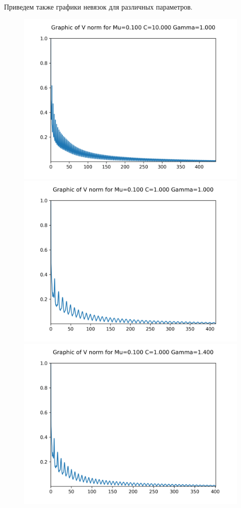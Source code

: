 \newpage
Приведем также графики невязок для различных параметров.
\begin{figure}[H]
	\centering
	\includegraphics[scale=0.65]{../graphs_data_nonsmooth_2/norms/Graph_V_norms_mu0.100_C10.000_gamma1.000.png}
	\includegraphics[scale=0.65]{../graphs_data_nonsmooth_2/norms/Graph_V_norms_mu0.100_C1.000_gamma1.000.png}	
	\includegraphics[scale=0.65]{../graphs_data_nonsmooth_2/norms/Graph_V_norms_mu0.100_C1.000_gamma1.400.png}
\end{figure}


